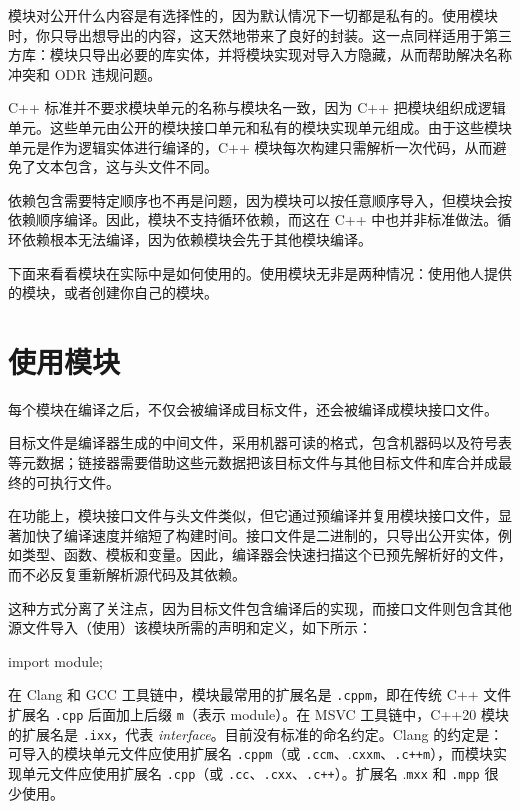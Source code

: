 
模块对公开什么内容是有选择性的，因为默认情况下一切都是私有的。使用模块时，你只导出想导出的内容，这天然地带来了良好的封装。这一点同样适用于第三方库：模块只导出必要的库实体，并将模块实现对导入方隐藏，从而帮助解决名称冲突和 ODR 违规问题。

\label{idx:749}
C++ 标准并不要求模块单元的名称与模块名一致，因为 C++ 把模块组织成逻辑单元。这些单元由公开的模块接口单元和私有的模块实现单元组成。由于这些模块单元是作为逻辑实体进行编译的，C++ 模块每次构建只需解析一次代码，从而避免了文本包含，这与头文件不同。

依赖包含需要特定顺序也不再是问题，因为模块可以按任意顺序导入，但模块会按依赖顺序编译。因此，模块不支持循环依赖，而这在 C++ 中也并非标准做法。循环依赖根本无法编译，因为依赖模块会先于其他模块编译。

下面来看看模块在实际中是如何使用的。使用模块无非是两种情况：使用他人提供的模块，或者创建你自己的模块。

\section{使用模块}

每个模块在编译之后，不仅会被编译成目标文件，还会被编译成模块接口文件。

\label{idx:750}
目标文件是编译器生成的中间文件，采用机器可读的格式，包含机器码以及符号表等元数据；链接器需要借助这些元数据把该目标文件与其他目标文件和库合并成最终的可执行文件。

在功能上，模块接口文件与头文件类似，但它通过预编译并复用模块接口文件，显著加快了编译速度并缩短了构建时间。接口文件是二进制的，只导出公开实体，例如类型、函数、模板和变量。因此，编译器会快速扫描这个已预先解析好的文件，而不必反复重新解析源代码及其依赖。

这种方式分离了关注点，因为目标文件包含编译后的实现，而接口文件则包含其他源文件导入（使用）该模块所需的声明和定义，如下所示：

\begin{codebox}[python]
import module;
\end{codebox}

\label{idx:751}
在 Clang 和 GCC 工具链中，模块最常用的扩展名是 \texttt{.cppm}，即在传统 C++ 文件扩展名 \texttt{.cpp} 后面加上后缀 \texttt{m}（表示 module）。在 MSVC 工具链中，C++20 模块的扩展名是 \texttt{.ixx}，代表 \emph{interface}。目前没有标准的命名约定。Clang 的约定是：可导入的模块单元文件应使用扩展名 \texttt{.cppm}（或 \texttt{.ccm}、.\texttt{cxxm}、\texttt{.c++m}），而模块实现单元文件应使用扩展名 \texttt{.cpp}（或 \texttt{.cc}、\texttt{.cxx}、\texttt{.c++}）。扩展名 .\texttt{mxx} 和 \texttt{.mpp} 很少使用。


